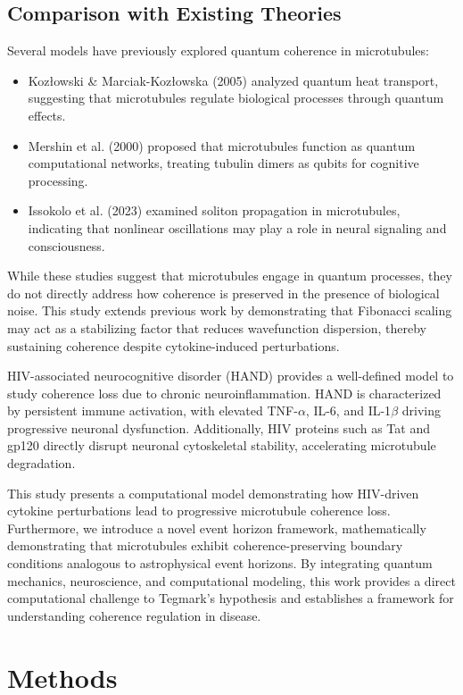 \documentclass[entropy,article,submit,oneauthor,pdftex,]{Definitions/mdpi}
\begin{document}
\subsection{Comparison with Existing Theories}
Several models have previously explored quantum coherence in microtubules:
\begin{itemize}
\item Kozłowski \& Marciak-Kozłowska (2005) analyzed quantum heat transport, suggesting that microtubules regulate biological processes through quantum effects.
\item Mershin et al. (2000) proposed that microtubules function as quantum computational networks, treating tubulin dimers as qubits for cognitive processing.
\item Issokolo et al. (2023) examined soliton propagation in microtubules, indicating that nonlinear oscillations may play a role in neural signaling and consciousness.
\end{itemize}
While these studies suggest that microtubules engage in quantum processes, they do not directly address how coherence is preserved in the presence of biological noise. This study extends previous work by demonstrating that Fibonacci scaling may act as a stabilizing factor that reduces wavefunction dispersion, thereby sustaining coherence despite cytokine-induced perturbations.

HIV-associated neurocognitive disorder (HAND) provides a well-defined model to study coherence loss due to chronic neuroinflammation. HAND is characterized by persistent immune activation, with elevated TNF-$\alpha$, IL-6, and IL-1$\beta$ driving progressive neuronal dysfunction. Additionally, HIV proteins such as Tat and gp120 directly disrupt neuronal cytoskeletal stability, accelerating microtubule degradation.

This study presents a computational model demonstrating how HIV-driven cytokine perturbations lead to progressive microtubule coherence loss. Furthermore, we introduce a novel event horizon framework, mathematically demonstrating that microtubules exhibit coherence-preserving boundary conditions analogous to astrophysical event horizons. By integrating quantum mechanics, neuroscience, and computational modeling, this work provides a direct computational challenge to Tegmark’s hypothesis and establishes a framework for understanding coherence regulation in disease.
\section{Methods}
\end{document}
